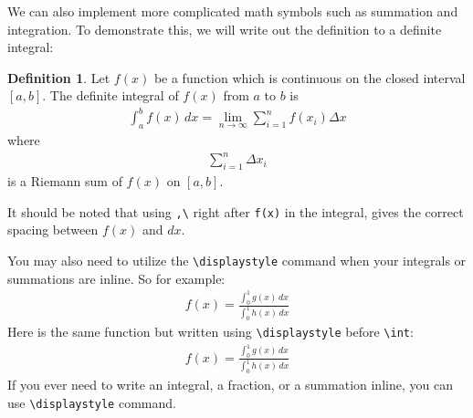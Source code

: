 \documentclass[]{article}%
\newcommand{\bs}{\textbackslash}
\newcommand{\TT}[1]{\texttt{#1}}
\theoremstyle{definition}
\newtheorem{dfn}{Definition}
\begin{document}
	We can also implement more complicated math symbols such as summation and integration.
	To demonstrate this, we will write out the definition to a definite integral:
	\begin{dfn}
		Let $f(x)$ be a function which is continuous on the closed interval $[a,b]$. The definite integral of $f(x)$ from $a$ to $b$ is
		\begin{align*}
			\int_a^b f(x)\,dx = \lim_{n\rightarrow \infty} \sum_{i=1}^n f(x_i) \Delta x 
		\end{align*}
		where
		\begin{align*}
			\sum_{i=1}^n \Delta x_i 
		\end{align*}
		is a Riemann sum of $f(x)$ on $[a,b]$.
	\end{dfn}
	\noindent It should be noted that using \TT{,\bs} right after \TT{f(x)} in the integral, gives the correct spacing between $f(x)$ and $dx$.
	
	You may also need to utilize the \TT{\bs displaystyle} command when your integrals or summations are inline. So for example:
	\begin{align}
		f(x) = \frac{\int_0^1g(x)\,dx}{\int_0^1h(x)\,dx}
	\end{align}
	Here is the same function but written using \TT{\bs displaystyle} before \TT{\bs int}:
	\begin{align}
		f(x) = \frac{\displaystyle\int_0^1g(x)\,dx}{\displaystyle\int_0^1h(x)\,dx}
	\end{align}
	If you ever need to write an integral, a fraction, or a summation inline, you can use \TT{\bs displaystyle} command.
	
\end{document}
